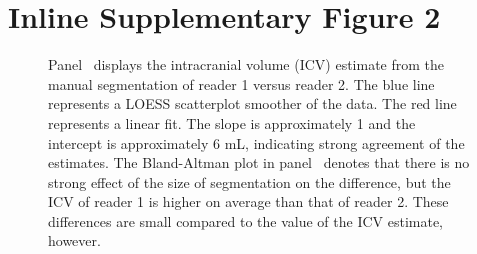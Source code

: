 \section*{Inline Supplementary Figure 2}
\begin{figure}[H]
\hfill
\caption[{\bf Comparison of Intracranial Volume (ICV) Estimates from 2 Manual Brain Segmentations.}]{ Panel~\protect{} displays the intracranial volume (ICV) estimate from the manual segmentation of reader 1 versus reader 2.  The blue line represents a LOESS scatterplot smoother of the data.  The red line represents a linear fit.  The slope is approximately 1 and the intercept is approximately 6 mL, indicating strong agreement of the estimates.  The Bland-Altman plot in panel~\protect{} denotes that there is no strong effect of the size of segmentation on the difference, but the ICV of reader 1 is higher on average than that of reader 2.  These differences are small compared to the value of the ICV estimate, however.}
\label{fig:reader_compare}
\end{figure}


